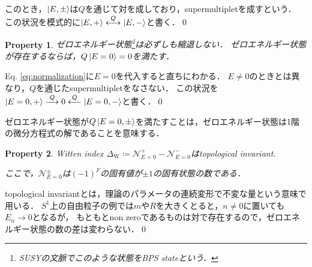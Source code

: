 \documentclass[english, dvipdfmx, a4paper]{jsarticle}
\theoremstyle{break}
\newtheorem{prop}{Property}
\newcommand{\N}{\mathcal{N}}
\begin{document}
	このとき，$\ket{E, \pm}$は$Q$を通じて対を成しており，supermultipletを成すという．
	この状況を模式的に$\ket{E, +}\overset{Q}{\longleftrightarrow}\ket{E, -}$と書く．\qed

	\begin{prop}
		ゼロエネルギー状態\footnote{SUSYの文脈でこのような状態をBPS stateという．}は必ずしも縮退しない．
		ゼロエネルギー状態が存在するならば，$Q\ket{E=0}=0$を満たす．
	\end{prop}
	Eq. \eqref{eq:normalization}に$E=0$を代入すると直ちにわかる．
	$E\neq0$のときとは異なり，$Q$を通じたsupermultipletをなさない．
	この状況を$\ket{E=0, +}\overset{Q}{\longrightarrow} 0 \overset{Q}{\longleftarrow} \ket{E=0, -}$と書く．\qed

	ゼロエネルギー状態が$Q\ket{E=0, \pm}$を満たすことは，ゼロエネルギー状態は1階の微分方程式の解であることを意味する．


	\begin{prop}
		Witten index $\Delta_{\text{W}} \coloneqq \N_{E=0}^{+}-\N_{E=0}^{-}$はtopological invariant.

		ここで，$\N_{E=0}^{\pm}$は$(-1)^F$の固有値が$\pm1$の固有状態の数である．
	\end{prop}
	topological invariantとは，理論のパラメータの連続変形で不変な量という意味で用いる．
	$S^1$上の自由粒子の例では$m$や$R$を大きくとると，$n\neq0$に置いても$E_n\to0$となるが，
	もともとnon zeroであるものは対で存在するので，ゼロエネルギー状態の数の差は変わらない．\qed
\end{document}
